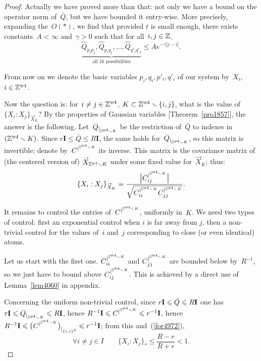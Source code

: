 \begin{proof}
Actually we have proved more than that:
not only we have a bound on the operator norm of~$\bar{Q}$,
but we have bounded it entry-wise.
More precisely, expanding the~$O(*)$, we find that provided $t$ is small enough,
there exists constants~$A < \infty$ and~$\gamma > 0$ such that for all~$i,j\in\mathbb{Z}$,
\[ \underbrace{\hat{Q}_{p_ip_j}, \hat{Q}_{p_iq_j}, \ldots, \hat{Q}_{q'_iq'_j}}%
_{\text{all 16 possibilities}} \leq A e^{-\gamma|j-i|} .\]

\begin{Not}
From now on we denote the basic variables $p_i, q_i, p'_i, q'_i$ of our system by~$X_i$,
$i \in \mathbb{Z}^{\uplus4}$.
\end{Not}

Now the question is: for~$i\neq j \in \mathbb{Z}^{\uplus4}$,
$K \subset \mathbb{Z}^{\uplus4} \smallsetminus \{i,j\}$,
what is the value of~${\{X_i:X_j\}}_{\vec{X}_K}$?
%
By the properties of Gaussian variables [Theorem~\ref{pro1857}], the answer is the following.
Let~$\bar{Q}_{|_{\ZZ^{\uplus4}\setminus K}}$ be the restriction
of~$\bar{Q}$ to indexes in~$(\mathbb{Z}^{\uplus4}\smallsetminus K)$.
Since $r\mathbf{I} \leq \bar{Q} \leq R\mathbf{I}$, the same holds
for~$\bar{Q}_{|_{\ZZ^{\uplus4}\setminus K}}$, so this matrix is invertible;
denote by~$\bar{C}^{|^{\ZZ^{\uplus4}\setminus K}}$ its inverse.
This matrix is the covariance matrix of (the centered version of)
$\vec{X}_{\ZZ^{\uplus4}\setminus K}$ under some fixed value for~$\vec{X}_K$;
thus:
\[\label{for4972} \{X_i:X_j\}_{\vec{X}_K} =
\frac{\Big| \bar{C}^{|^{\ZZ^{\uplus4}\setminus K}}_{ij} \Big|}
{\sqrt{\bar{C}^{|^{\ZZ^{\uplus4}\setminus K}}_{ii}
\bar{C}^{|^{\ZZ^{\uplus4}\setminus K}}_{jj}}} .\]

It remains to control the entries of~$\bar{C}^{|^{\ZZ^{\uplus4}\setminus K}}$, uniformly in~$K$.
We need two types of control: first an exponential control when $i$ is far away from $j$,
then a non-trivial control for the values of~$i$ and~$j$ corresponding to close
(or even identical) atoms.

Let us start with the first one.
$\bar{C}^{|^{\ZZ^{\uplus4}\setminus K}}_{ii}$ and
$\bar{C}^{|^{\ZZ^{\uplus4}\setminus K}}_{jj}$ are bounded below by~$R^{-1}$,
so we just have to bound above $\bar{C}^{|^{\ZZ^{\uplus4}\setminus K}}_{ij}$.
This is achieved by a direct use of Lemma~\ref{lem4060} in appendix.

Concerning the uniform non-trivial control, since $r\mbf{I} \leq \bar{Q} \leq R\mbf{I}$
one has $r\mbf{I} \leq \bar{Q}_{|_{\ZZ^{\uplus4}\setminus K}} \leq R\mbf{I}$,
hence $R^{-1}\mbf{I} \leq \bar{C}^{|^{\ZZ^{\uplus4}\setminus K}} \leq r^{-1}\mbf{I}$,
hence $R^{-1}\mbf{I} \leq \big(\bar{C}^{|^{\ZZ^{\uplus4}\setminus K}}\big)_{|_{\{i,j\}^2}} \leq r^{-1}\mbf{I}$;
from this and~(\ref{for4972}),
\[ \forall i \neq j \in I \qquad \{X_i:X_j\}_* \leq \frac{R-r}{R+r} < 1 .\]
%
\end{proof}

